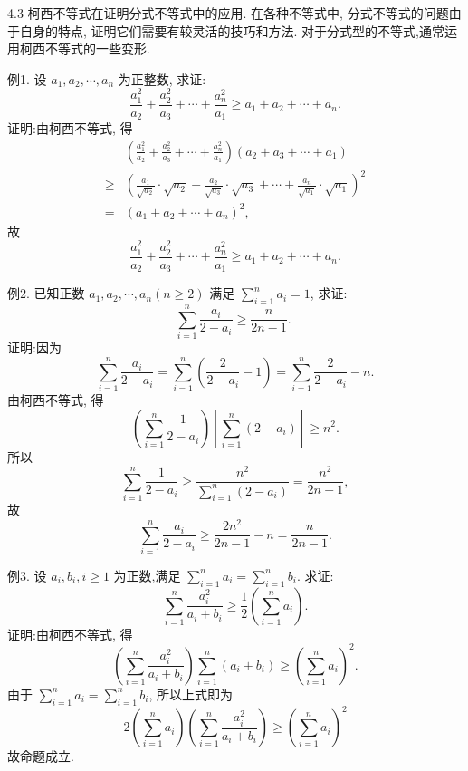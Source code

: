 
4.3 柯西不等式在证明分式不等式中的应用.
在各种不等式中, 分式不等式的问题由于自身的特点, 证明它们需要有较灵活的技巧和方法.
对于分式型的不等式,通常运用柯西不等式的一些变形.



例1. 设 $a_1, a_2, \cdots, a_n$ 为正整数, 求证:
$$
\frac{a_1^2}{a_2}+\frac{a_2^2}{a_3}+\cdots+\frac{a_n^2}{a_1} \geqslant a_1+a_2+\cdots+a_n .
$$
证明:由柯西不等式, 得
$$
\begin{aligned}
& \left(\frac{a_1^2}{a_2}+\frac{a_2^2}{a_3}+\cdots+\frac{a_n^2}{a_1}\right)\left(a_2+a_3+\cdots+a_1\right) \\
\geqslant & \left(\frac{a_1}{\sqrt{a_2}} \cdot \sqrt{a_2}+\frac{a_2}{\sqrt{a_3}} \cdot \sqrt{a_3}+\cdots+\frac{a_n}{\sqrt{a_1}} \cdot \sqrt{a_1}\right)^2 \\
= & \left(a_1+a_2+\cdots+a_n\right)^2,
\end{aligned}
$$
故
$$
\frac{a_1^2}{a_2}+\frac{a_2^2}{a_3}+\cdots+\frac{a_n^2}{a_1} \geqslant a_1+a_2+\cdots+a_n .
$$



例2. 已知正数 $a_1, a_2, \cdots, a_n(n \geqslant 2)$ 满足 $\sum_{i=1}^n a_i=1$, 求证:
$$
\sum_{i=1}^n \frac{a_i}{2-a_i} \geqslant \frac{n}{2 n-1} \text {. }
$$
证明:因为
$$
\sum_{i=1}^n \frac{a_i}{2-a_i}=\sum_{i=1}^n\left(\frac{2}{2-a_i}-1\right)=\sum_{i=1}^n \frac{2}{2-a_i}-n .
$$
由柯西不等式, 得
$$
\left(\sum_{i=1}^n \frac{1}{2-a_i}\right)\left[\sum_{i=1}^n\left(2-a_i\right)\right] \geqslant n^2 .
$$
所以
$$
\sum_{i=1}^n \frac{1}{2-a_i} \geqslant \frac{n^2}{\sum_{i=1}^n\left(2-a_i\right)}=\frac{n^2}{2 n-1},
$$
故
$$
\sum_{i=1}^n \frac{a_i}{2-a_i} \geqslant \frac{2 n^2}{2 n-1}-n=\frac{n}{2 n-1} .
$$



例3. 设 $a_i, b_i, i \geqslant 1$ 为正数,满足 $\sum_{i=1}^n a_i=\sum_{i=1}^n b_i$. 求证:
$$
\sum_{i=1}^n \frac{a_i^2}{a_i+b_i} \geqslant \frac{1}{2}\left(\sum_{i=1}^n a_i\right) .
$$
证明:由柯西不等式, 得
$$
\left(\sum_{i=1}^n \frac{a_i^2}{a_i+b_i}\right) \sum_{i=1}^n\left(a_i+b_i\right) \geqslant\left(\sum_{i=1}^n a_i\right)^2 .
$$
由于 $\sum_{i=1}^n a_i=\sum_{i=1}^n b_i$, 所以上式即为
$$
2\left(\sum_{i=1}^n a_i\right)\left(\sum_{i=1}^n \frac{a_i^2}{a_i+b_i}\right) \geqslant\left(\sum_{i=1}^n a_i\right)^2
$$
故命题成立.



